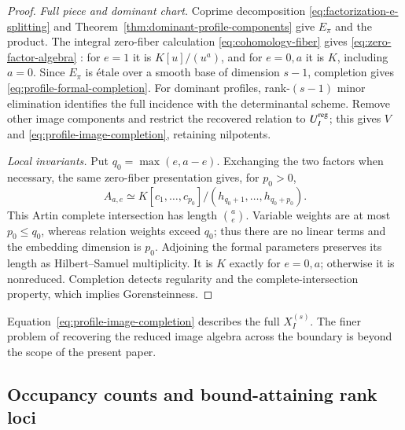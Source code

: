\documentclass[10pt,fleqn]{article}
\numberwithin{equation}{section}
\begin{document}
\begin{proof}
\emph{Full piece and dominant chart.}
Coprime decomposition \eqref{eq:factorization-e-splitting} and
Theorem~\ref{thm:dominant-profile-components} give $E_\pi$ and the product.
The integral zero-fiber calculation \eqref{eq:cohomology-fiber}
gives \eqref{eq:zero-factor-algebra} \cite{LaksovThorup}:
for $e=1$ it is $K[u]/(u^a)$, and for $e=0,a$ it is $K$,
including $a=0$.  Since $E_\pi$ is \'etale over a smooth base of
dimension $s-1$, completion gives \eqref{eq:profile-formal-completion}.
For dominant profiles, rank-$(s-1)$ minor elimination identifies the
full incidence with the determinantal scheme.  Remove other image
components and restrict the recovered relation to $U_I^{\rm reg}$;
this gives $V$ and \eqref{eq:profile-image-completion}, retaining nilpotents.

\emph{Local invariants.}
Put $q_0=\max(e,a-e)$.  Exchanging the two factors when necessary,
the same zero-fiber presentation gives, for $p_0>0$,
\[
 A_{a,e}\simeq K[c_1,\ldots,c_{p_0}]/(h_{q_0+1},\ldots,h_{q_0+p_0}).
\]
This Artin complete intersection has length $\binom ae$.
Variable weights are at most $p_0\le q_0$, whereas relation weights
exceed $q_0$; thus there are no linear terms and the embedding dimension
is $p_0$.  Adjoining the formal parameters preserves its length as
Hilbert--Samuel multiplicity.  It is $K$ exactly for $e=0,a$;
otherwise it is nonreduced.  Completion detects regularity and the
complete-intersection property, which implies Gorensteinness.
\end{proof}

Equation~\eqref{eq:profile-image-completion} describes the full
$X_I^{(s)}$.  The finer problem of recovering the reduced image algebra across
the boundary is beyond the scope of the present paper.

\subsection{Occupancy counts and bound-attaining rank loci}
\label{r26:formal:deep}
\end{document}
